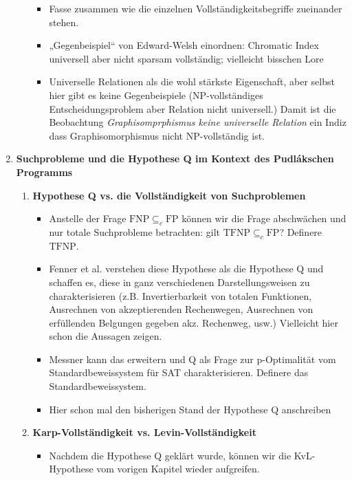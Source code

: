 \documentclass[nofonts]{uebung}
\begin{document}
\begin{enumerate}[label*=\arabic*.]
\begin{enumerate}[label*=\arabic*.]
\begin{itemize}
                    \item Fasse zusammen wie die einzelnen Vollständigkeitsbegriffe zueinander stehen.
                    \item „Gegenbeispiel“ von Edward-Welsh einordnen: Chromatic Index universell aber nicht sparsam vollständig; vielleicht bisschen Lore
                    \item Universelle Relationen als die wohl stärkste Eigenschaft, aber selbst hier gibt es keine Gegenbeispiele (NP-vollständiges Entscheidungsproblem aber Relation nicht universell.) Damit ist die Beobachtung \emph{Graphisomprphismus keine universelle Relation} ein Indiz dass Graphisomorphismus nicht NP-vollständig ist.
                \end{itemize}
        \end{enumerate}
    \item \textbf{Suchprobleme und die Hypothese Q im Kontext des Pudlákschen Programms}
        \begin{enumerate}[label*=\arabic*.]
            \item \textbf{Hypothese Q vs. die Vollständigkeit von Suchproblemen}
            \begin{itemize}
                \item Anstelle der Frage $\mathrm{FNP}\subseteq_c \mathrm{FP}$ können wir die Frage abschwächen und nur totale Suchprobleme betrachten: gilt $\mathrm{TFNP}\subseteq_c \mathrm{FP}$? Definere $\mathrm{TFNP}$.
                \item Fenner et al. verstehen diese Hypothese als die Hypothese Q und schaffen es, diese in ganz verschiedenen Darstellungsweisen zu charakterisieren (z.B. Invertierbarkeit von totalen Funktionen, Ausrechnen von akzeptierenden Rechenwegen, Ausrechnen von erfüllenden Belgungen gegeben akz. Rechenweg, usw.) Vielleicht hier schon die Aussagen zeigen.
                \item Messner kann das erweitern und Q als Frage zur p-Optimalität vom Standardbeweissystem für SAT charakterisieren. Definere das Standardbeweissystem.
                \item Hier schon mal den bisherigen Stand der Hypothese Q anschreiben
            \end{itemize}
            \item \textbf{Karp-Vollständigkeit vs. Levin-Vollständigkeit}
            \begin{itemize}
                \item Nachdem die Hypothese Q geklärt wurde, können wir die KvL-Hypothese vom vorigen Kapitel wieder aufgreifen.

\end{itemize}
\end{enumerate}
\end{enumerate}
\end{document}
